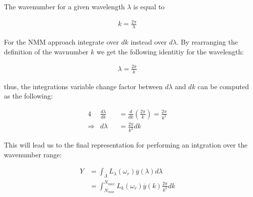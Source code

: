 The wavenumber for a given wavelength $\lambda$ is equal to

\begin{align}
  k = \frac{2 \pi}{\lambda} \nonumber
\end{align}

For the NMM approach integrate over $dk$ instead over $d\lambda$. By rearranging the definition of the wavnumber $k$ we get the following identitiy for the wavelength:

\begin{align}
  \lambda = \frac{2 \pi}{k} \nonumber
\end{align}

thus, the integrations variable change factor between $d\lambda$ and $dk$ can be computed as the following:

\begin{alignat}{4}
& \frac{d\lambda}{dk} &&= \frac{d}{dk} \left(\frac{2 \pi}{k} \right) = \frac{2 \pi}{k^2}  \nonumber \\
\Rightarrow{} & d\lambda &&= \frac{2 \pi}{k^2} dk \nonumber
\end{alignat}

This will lead us to the final representation for performing an intgration over the wavenumber range:

\begin{align}
Y 
&= \int_{\Lambda}L_\lambda(\omega_r)\overline{y}(\lambda)d\lambda \nonumber \\
&= \int_{N_{min}}^{N_{max}} L_k(\omega_r)\overline{y}(k) \frac{2 \pi}{k^2} dk
\label{eq:wavenumberintegration}
\end{align}
